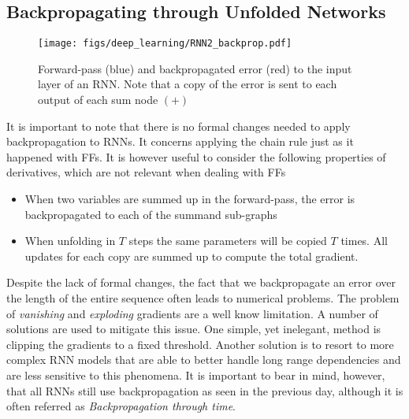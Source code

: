 \subsection{Backpropagating through Unfolded Networks}

\begin{figure}[!h]
\centering
\texttt{[image: figs/deep\_learning/RNN2\_backprop.pdf]}
        \caption{Forward-pass (blue) and backpropagated error (red) to the input layer of an RNN. Note that a copy of the error is sent to each output of each sum node $(+)$}
\label{fig:RNNbackprop}
\end{figure}

It is important to note that there is no formal changes needed to apply
backpropagation to RNNs. It concerns applying the chain rule just as it
happened with FFs. It is however useful to consider the following properties of
derivatives, which are not relevant when dealing with FFs

\begin{itemize}
\item When two variables are summed up in the forward-pass, the error is backpropagated to each of the summand sub-graphs
\item When unfolding in $T$ steps the same parameters will be copied $T$ times. All updates for each copy are summed up to compute the total gradient. 
\end{itemize}

Despite the lack of formal changes, the fact that we backpropagate an error
over the length of the entire sequence often leads to numerical problems. The
problem of \textit{vanishing} and \textit{exploding} gradients are a well know
limitation. A number of solutions are used to mitigate this issue. One simple,
yet inelegant, method is clipping the gradients to a fixed threshold. Another
solution is to resort to more complex RNN models that are able to better handle
long range dependencies and are less sensitive to this phenomena. It is
important to bear in mind, however, that all RNNs still use backpropagation as
seen in the previous day, although it is often referred as
\textit{Backpropagation through time}. 

